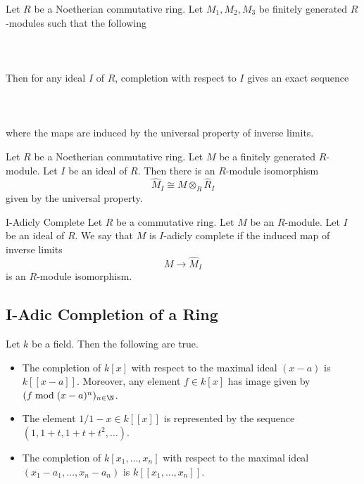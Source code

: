 \documentclass[a4paper]{article}
\begin{document}
\begin{prp}{}{} Let $R$ be a Noetherian commutative ring. Let $M_1,M_2,M_3$ be finitely generated $R$-modules such that the following \\~\\
 \\~\\
Then for any ideal $I$ of $R$, completion with respect to $I$ gives an exact sequence \\~\\
 \\~\\
where the maps are induced by the universal property of inverse limits. 
\end{prp}

\begin{prp}{}{} Let $R$ be a Noetherian commutative ring. Let $M$ be a finitely generated $R$-module. Let $I$ be an ideal of $R$. Then there is an $R$-module isomorphism $$\widehat{M}_I\cong M\otimes_R\widehat{R}_I$$ given by the universal property. 
\end{prp}

\begin{defn}{I-Adicly Complete}{} Let $R$ be a commutative ring. Let $M$ be an $R$-module. Let $I$ be an ideal of $R$. We say that $M$ is $I$-adicly complete if the induced map of inverse limits $$M\to\widehat{M}_I$$ is an $R$-module isomorphism. 
\end{defn}

\subsection{I-Adic Completion of a Ring}
\begin{eg}{}{} Let $k$ be a field. Then the following are true. 
\begin{itemize}
\item The completion of $k[x]$ with respect to the maximal ideal $(x-a)$ is $k[[x-a]]$. Moreover, any element $f\in k[x]$ has image given by $(f\bmod (x-a)^n)_{n\in\N}$. 
\item The element $1/1-x\in k[[x]]$ is represented by the sequence $(1,1+t,1+t+t^2,\dots)$. 
\item The completion of $k[x_1,\dots,x_n]$ with respect to the maximal ideal $(x_1-a_1,\dots,x_n-a_n)$ is $k[[x_1,\dots,x_n]]$. 
\end{itemize}
\end{eg}
\end{document}
